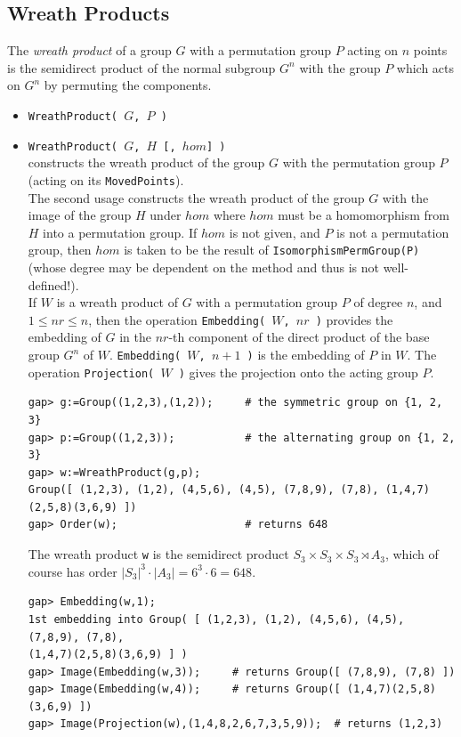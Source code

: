 \subsection{Wreath Products\protect\footnotemark}
The \emph{wreath product} of a group $G$ with a permutation group $P$ acting on $n$
points is the semidirect product of the normal subgroup $G^n$ with the group $P$
which acts on $G^n$ by permuting the components. 
\begin{itemize}
\item {\tt WreathProduct( $G$, $P$ )}
\item {\tt WreathProduct( $G$, $H$ [, $hom$] )}\\
constructs the wreath product of the group $G$ with the permutation group $P$ 
(acting on its {\tt MovedPoints}). 
\\[4pt]
The second usage constructs the wreath product of the group $G$ with the image of the
group $H$ under $hom$ where $hom$ must be a homomorphism from $H$ into a permutation
group.  If $hom$ is not given, and $P$ is not a permutation group, then $hom$ is
taken to be the result of {\tt IsomorphismPermGroup(P)} (whose degree may be
dependent on the method and thus is not well-defined!).
\\[4pt]
If $W$ is a wreath product of $G$ with a permutation group $P$ of degree $n$, and 
$1 \leq nr \leq n$, then the operation
{\tt Embedding( $W$, $nr$ )} provides the embedding of $G$ in the $nr$-th component
of the direct product of the base group $G^n$ of $W$. {\tt Embedding( $W$, $n+1$ )}
is the embedding of $P$ in $W$. The operation {\tt Projection( $W$ )} 
gives the projection onto the acting group $P$.
{\codesize
\begin{verbatim}
gap> g:=Group((1,2,3),(1,2));     # the symmetric group on {1, 2, 3}
gap> p:=Group((1,2,3));           # the alternating group on {1, 2, 3}
gap> w:=WreathProduct(g,p);
Group([ (1,2,3), (1,2), (4,5,6), (4,5), (7,8,9), (7,8), (1,4,7)(2,5,8)(3,6,9) ])
gap> Order(w);                    # returns 648
\end{verbatim}}
The wreath product {\tt w} is the semidirect product $S_3 \times S_3 \times S_3
\rtimes A_3$, which of course has order $|S_3|^3\cdot |A_3| = 6^3 \cdot 6 = 648$.

{\codesize
\begin{verbatim}
gap> Embedding(w,1);
1st embedding into Group( [ (1,2,3), (1,2), (4,5,6), (4,5), (7,8,9), (7,8),
(1,4,7)(2,5,8)(3,6,9) ] )
gap> Image(Embedding(w,3));     # returns Group([ (7,8,9), (7,8) ])
gap> Image(Embedding(w,4));     # returns Group([ (1,4,7)(2,5,8)(3,6,9) ])
gap> Image(Projection(w),(1,4,8,2,6,7,3,5,9));  # returns (1,2,3)


\end{verbatim}}
\end{itemize}
